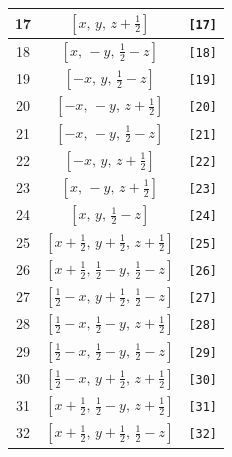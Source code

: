 \documentclass[fleqn,8pt]{jsarticle}
\begin{document}
\begin{longtable}{ccc}
17 & $\left[ x,\, y,\, z + \frac{1}{2} \right]$ & {\tt [17]} \\ \hline
18 & $\left[ x,\, - y,\, \frac{1}{2} - z \right]$ & {\tt [18]} \\ \hline
19 & $\left[ - x,\, y,\, \frac{1}{2} - z \right]$ & {\tt [19]} \\ \hline
20 & $\left[ - x,\, - y,\, z + \frac{1}{2} \right]$ & {\tt [20]} \\ \hline
21 & $\left[ - x,\, - y,\, \frac{1}{2} - z \right]$ & {\tt [21]} \\ \hline
22 & $\left[ - x,\, y,\, z + \frac{1}{2} \right]$ & {\tt [22]} \\ \hline
23 & $\left[ x,\, - y,\, z + \frac{1}{2} \right]$ & {\tt [23]} \\ \hline
24 & $\left[ x,\, y,\, \frac{1}{2} - z \right]$ & {\tt [24]} \\ \hline
25 & $\left[ x + \frac{1}{2},\, y + \frac{1}{2},\, z + \frac{1}{2} \right]$ & {\tt [25]} \\ \hline
26 & $\left[ x + \frac{1}{2},\, \frac{1}{2} - y,\, \frac{1}{2} - z \right]$ & {\tt [26]} \\ \hline
27 & $\left[ \frac{1}{2} - x,\, y + \frac{1}{2},\, \frac{1}{2} - z \right]$ & {\tt [27]} \\ \hline
28 & $\left[ \frac{1}{2} - x,\, \frac{1}{2} - y,\, z + \frac{1}{2} \right]$ & {\tt [28]} \\ \hline
29 & $\left[ \frac{1}{2} - x,\, \frac{1}{2} - y,\, \frac{1}{2} - z \right]$ & {\tt [29]} \\ \hline
30 & $\left[ \frac{1}{2} - x,\, y + \frac{1}{2},\, z + \frac{1}{2} \right]$ & {\tt [30]} \\ \hline
31 & $\left[ x + \frac{1}{2},\, \frac{1}{2} - y,\, z + \frac{1}{2} \right]$ & {\tt [31]} \\ \hline
32 & $\left[ x + \frac{1}{2},\, y + \frac{1}{2},\, \frac{1}{2} - z \right]$ & {\tt [32]} \\
\end{longtable}
\end{document}
